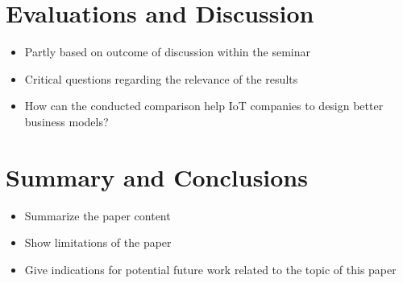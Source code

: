 \section{Evaluations and Discussion}
	\begin{itemize} 
		\item Partly based on outcome of discussion within the seminar
		\item Critical questions regarding the relevance of the results
		\item How can the conducted comparison help IoT companies to design better business models?
	\end{itemize}

\section{Summary and Conclusions}
	\begin{itemize} 
		\item Summarize the paper content
		\item Show limitations of the paper
		\item Give indications for potential future work related to the topic of this paper
	\end{itemize}

